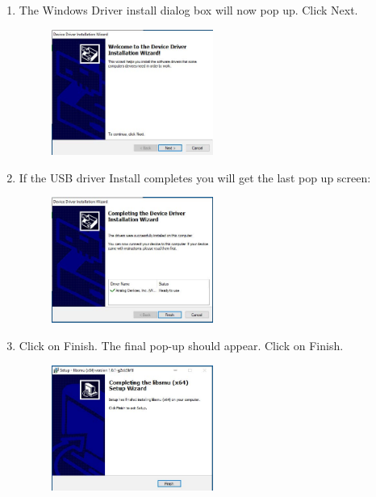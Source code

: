 \documentclass[12pt]{../manual}
\begin{document}
\begin{enumerate}
\begin{figure}[!ht]
\end{figure}
\item The Windows Driver install dialog box will now pop up. Click Next.
\begin{figure}[!ht]
\begin{center}
\includegraphics[width=0.5\textwidth]{figures/InstallationWizard}
\end{center}
\end{figure}
\newpage
\item If the USB driver Install completes you will get the last pop up screen:
\begin{figure}[!ht]
\begin{center}
\includegraphics[width=0.5\textwidth]{figures/WizardDone}
\end{center}
\end{figure}
\item Click on Finish. The final pop-up should appear. Click on Finish.
\begin{figure}[!ht]
\begin{center}
\includegraphics[width=0.5\textwidth]{figures/Finishing}
\end{center}
\end{figure}
\end{enumerate}
\end{document}
